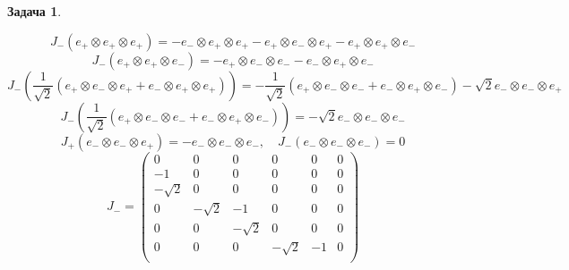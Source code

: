 \documentclass[12pt]{article}
\theoremstyle{definition}
\newtheorem{zad}{Задача}[section]
\begin{document}
\begin{zad}
\begin{itemize}
    \begin{equation*}
        J_-(e_+\otimes e_+\otimes e_+)=-e_-\otimes e_+\otimes e_+-e_+\otimes e_-\otimes e_+-e_+\otimes e_+\otimes e_-
    \end{equation*}
    \begin{equation}
        J_-(e_+\otimes e_+\otimes e_-)=-e_+\otimes e_-\otimes e_--e_-\otimes e_+\otimes e_-
    \end{equation}
    \begin{equation*}
        J_-\left(\frac{1}{\sqrt{2}}(e_+\otimes e_-\otimes e_++e_-\otimes e_+\otimes e_+)\right)=-\frac{1}{\sqrt{2}}(e_+\otimes e_-\otimes e_-+e_-\otimes e_+\otimes e_-)-\sqrt{2}e_-\otimes e_-\otimes e_+
    \end{equation*}
    \begin{equation}
        J_-\left(\frac{1}{\sqrt{2}}(e_+\otimes e_-\otimes e_-+e_-\otimes e_+\otimes e_-)\right)=-\sqrt{2}e_-\otimes e_-\otimes e_-
    \end{equation}
    \begin{equation}
        J_+(e_-\otimes e_-\otimes e_+)=-e_-\otimes e_-\otimes e_-,\quad J_-(e_-\otimes e_-\otimes e_-)=0
    \end{equation}
    \begin{equation}
        \boxed{J_-=\left(
    \begin{array}{cccccc}
    0 & 0 & 0 & 0 & 0 & 0\\
    -1 & 0 & 0 & 0 & 0 & 0\\
    -\sqrt{2} & 0 & 0 & 0 & 0 & 0\\
    0 & -\sqrt{2} & -1 & 0 & 0 & 0\\
    0 & 0 & -\sqrt{2} & 0 & 0 & 0\\
    0 & 0 & 0 & -\sqrt{2} & -1 & 0\\
    \end{array}
    \right)}
    \end{equation}
    

\end{itemize}
\end{zad}
\end{document}
